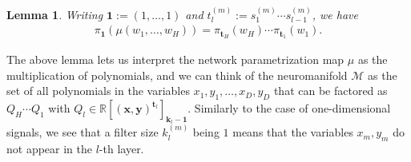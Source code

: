 \documentclass[twoside]{article}
\newtheorem{lemma}[theorem]{Lemma}
\theoremstyle{definition}
\theoremstyle{remark}
\begin{document}
\begin{lemma} \label{lem:polynomialMultiplication}
    Writing $\boldsymbol{1} := (1, \ldots, 1)$ and $t_l^{(m)} := s_1^{(m)} \cdots s_{l-1}^{(m)}$, we have \begin{align*}
        \pi_{\boldsymbol{1}} (\mu(w_1, \ldots, w_H)) = 
    \pi_{\boldsymbol{t}_H}(w_H) \cdots \pi_{\boldsymbol{t}_1}(w_1).
    \end{align*}
\end{lemma}

The above lemma lets us interpret the network parametrization map $\mu$ as the multiplication of polynomials,
and we can think of the neuromanifold $\mathcal{M}$ as the set of all polynomials 
in the variables $x_1,y_1,\ldots,x_D,y_D$ that can be factored as $Q_H \cdots Q_1$ with $Q_l \in \mathbb{R}[(\boldsymbol{x},\boldsymbol{y})^{\boldsymbol{t}_l}]_{\boldsymbol{k}_l-\boldsymbol{1}}$.
Similarly to the case of one-dimensional signals, we see that a filter size $k^{(m)}_l$ being $1$ means that the variables $x_m,y_m$ do not appear in the $l$-th layer.
\end{document}
